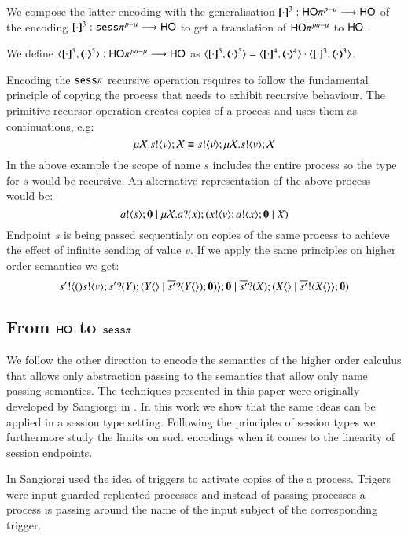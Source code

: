 We compose the latter encoding with the generalisation $[\!\![\cdot]\!\!]^3 : \mathsf{HO}\pi^{p-\mu} \longrightarrow \mathsf{HO}$
of the encoding $[\!\![\cdot]\!\!]^3 : \mathtt{sess}\pi^{p-\mu} \longrightarrow \mathsf{HO}$ to get a translation
of $\mathsf{HO}\pi^{pa-\mu}$ to $\mathsf{HO}$.

\begin{definition}
	We define $\encod{\cdot}{\cdot}{5}: \HOp^{pa-\mu} \longrightarrow \HO$
	as $\encod{\cdot}{\cdot}{5} = \encod{\cdot}{\cdot}{4} \cat \encod{\cdot}{\cdot}{3}$.	
\end{definition}

Encoding the $\mathtt{sess}\pi$ recursive operation requires to follow the fundamental
principle of copying the process that needs to exhibit recursive behaviour.
The primitive recursor operation creates copies of a process and uses them
as continuations, e.g:
\[
	\mu \mathcal{X}. s ! \langle v \rangle ; \mathcal{X} \equiv s ! \langle v \rangle ; \mu \mathcal{X}. s ! \langle v \rangle ; \mathcal{X}
\]
In the above example the scope of name $s$ includes the entire process so
the type for $s$ would be recursive. An alternative representation
of the above process would be:
\[
	a ! \langle s \rangle ; \mathbf{0} \;|\; \mu \mathcal{X}. a ? (x) ; (x ! \langle v \rangle ; a ! \langle x \rangle ; \mathbf{0} \;|\; X) 
\]
Endpoint $s$ is being passed sequentialy on copies of the 
same process to achieve the effect of infinite sending of value $v$.
If we apply the same principles on higher order semantics we get:
\[
	s' ! \langle () s ! \langle v \rangle ; s' ? (Y) ; (Y\langle  \rangle \;|\; \overline{s'} ? (Y\langle  \rangle) ; \mathbf{0}) \rangle ; \mathbf{0} \;|\; \overline{s'} ? (X) ; (X\langle  \rangle \;|\; \overline{s'} ! \langle X\langle  \rangle \rangle ; \mathbf{0} )
\]




\subsection{From $\mathsf{HO}$ to $\mathtt{sess}\pi$}

We follow the other direction to encode the semantics of the
higher order calculus that allows only abstraction passing
to the semantics that allow only name passing semantics.
The techniques presented in this paper were originally developed
by Sangiorgi in \cite{}. In this work we show that
the same ideas can be applied in a session type setting.
Following the principles of session types we furthermore
study the limits on such encodings when it comes to the linearity
of session endpoints.

In \cite{} Sangiorgi used the idea of triggers to activate
copies of the a process. Trigers were input guarded replicated
processes and instead of passing processes a process is
passing around the name of the input subject of the corresponding trigger.

